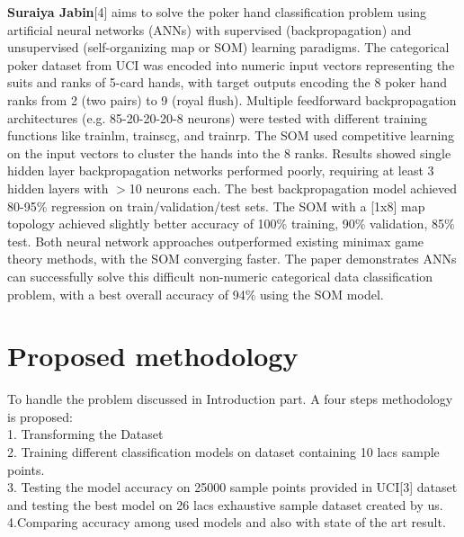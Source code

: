 \documentclass[11pt, oneside]{article}   	%
\begin{document}
\textbf{Suraiya Jabin}[4] aims to solve the poker hand classification problem using artificial neural networks (ANNs) with supervised (backpropagation) and unsupervised (self-organizing map or SOM) learning paradigms. The categorical poker dataset from UCI was encoded into numeric input vectors representing the suits and ranks of 5-card hands, with target outputs encoding the 8 poker hand ranks from 2 (two pairs) to 9 (royal flush). Multiple feedforward backpropagation architectures (e.g. 85-20-20-20-8 neurons) were tested with different training functions like trainlm, trainscg, and trainrp. The SOM used competitive learning on the input vectors to cluster the hands into the 8 ranks. Results showed single hidden layer backpropagation networks performed poorly, requiring at least 3 hidden layers with $>$10 neurons each. The best backpropagation model achieved 80-95\% regression on train/validation/test sets. The SOM with a [1x8] map topology achieved slightly better accuracy of 100\% training, 90\% validation, 85\% test. Both neural network approaches outperformed existing minimax game theory methods, with the SOM converging faster. The paper demonstrates ANNs can successfully solve this difficult non-numeric categorical data classification problem, with a best overall accuracy of 94\% using the SOM model.

\section{Proposed methodology}
To handle the problem discussed in Introduction part. A four steps methodology is proposed:
\\
1. Transforming the Dataset\\
2. Training different classification models on dataset containing 10 lacs sample points.\\
3. Testing the model accuracy on 25000 sample points provided in UCI[3] dataset and testing the best model on 26 lacs exhaustive sample dataset created by us.\\
4.Comparing accuracy among used models and also with state of the art result.
\end{document}

